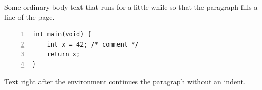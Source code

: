 \documentclass{article}
\begin{document}
Some ordinary body text that runs for a little while so that the paragraph fills a line of the page.
\begin{lstlisting}[basicstyle=\ttfamily,numbers=left,numberstyle=\tiny,numbersep=5pt]
int main(void) {
    int x = 42; /* comment */
    return x;
}
\end{lstlisting}
Text right after the environment continues the paragraph without an indent.
\end{document}
